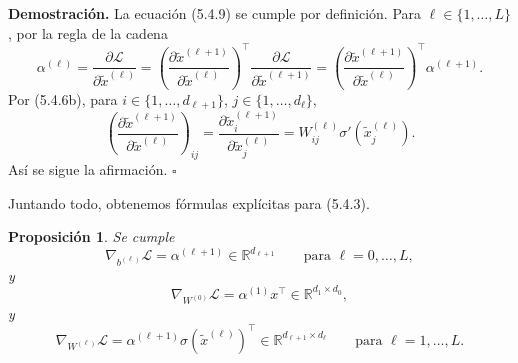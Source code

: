 \documentclass[11pt]{report}
\newenvironment{tcolorbox}[1][]{\par\medskip\noindent\ignorespaces}{\par\medskip}
\theoremstyle{definition}
\theoremstyle{plain}
\newtheorem{proposicion}[definicion]{Proposición}
\numberwithin{equation}{section}
\begin{document}
\textbf{Demostración.} La ecuación (5.4.9) se cumple por definición. Para \(\ell\in\{1,\ldots,L\}\), por la regla de la cadena
\begin{equation*}
    \alpha^{(\ell)}
    =
    \frac{\partial\mathcal{L}}{\partial\widetilde{x}^{(\ell)}}
    =
    \left(
        \frac{\partial\widetilde{x}^{(\ell+1)}}{\partial\widetilde{x}^{(\ell)}}
    \right)^\top
    \frac{\partial\mathcal{L}}{\partial\widetilde{x}^{(\ell+1)}}
    =
    \left(
        \frac{\partial\widetilde{x}^{(\ell+1)}}{\partial\widetilde{x}^{(\ell)}}
    \right)^\top
    \alpha^{(\ell+1)}.
\end{equation*}
Por (5.4.6b), para \(i\in\{1,\ldots,d_{\ell+1}\}\), \(j\in\{1,\ldots,d_\ell\}\),
\begin{equation*}
    \left(
        \frac{\partial\widetilde{x}^{(\ell+1)}}{\partial\widetilde{x}^{(\ell)}}
    \right)_{ij}
    =
    \frac{\partial\widetilde{x}_i^{(\ell+1)}}{\partial\widetilde{x}_j^{(\ell)}}
    =
    W_{ij}^{(\ell)}\sigma'(\widetilde{x}_j^{(\ell)}).
\end{equation*}
Así se sigue la afirmación. \(\square\)

Juntando todo, obtenemos fórmulas explícitas para (5.4.3).

\begin{tcolorbox}[colback=blue!8, colframe=blue!8, boxrule=0pt]
\begin{proposicion}
Se cumple
\begin{equation*}
    \nabla_{b^{(\ell)}}\mathcal{L}
    =
    \alpha^{(\ell+1)}
    \in\mathbb{R}^{d_{\ell+1}}
    \qquad
    \text{para } \ell=0,\ldots,L,
\end{equation*}
y
\begin{equation*}
    \nabla_{W^{(0)}}\mathcal{L}
    =
    \alpha^{(1)}x^\top
    \in\mathbb{R}^{d_1\times d_0},
\end{equation*}
y
\begin{equation*}
    \nabla_{W^{(\ell)}}\mathcal{L}
    =
    \alpha^{(\ell+1)}
    \sigma(\widetilde{x}^{(\ell)})^\top
    \in\mathbb{R}^{d_{\ell+1}\times d_\ell}
    \qquad
    \text{para } \ell=1,\ldots,L.
\end{equation*}
\end{proposicion}
\end{tcolorbox}
\end{document}
